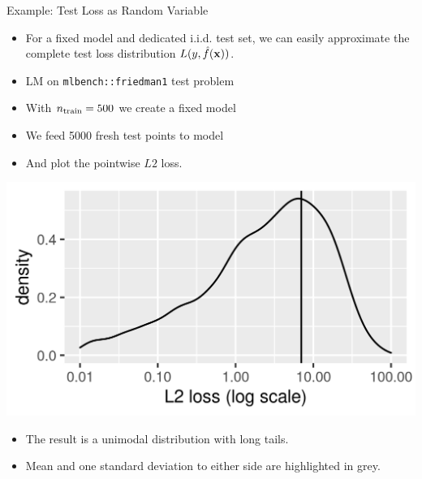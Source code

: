 \begin{vbframe}{Example: Test Loss as Random Variable}
\begin{itemize}
  \small
  \item For a fixed model and dedicated i.i.d. test set, we can easily approximate
      the complete test loss distribution $L(y, \hat{f}(\mathbf{x}))$.
  \item LM on \texttt{mlbench::friedman1} test problem
  \item With $n_{\mathrm{train}} = 500$ we create a fixed model
  \item We feed 5000 fresh test points to model
  \item And plot the pointwise $L2$ loss.
\end{itemize}

\vfill

\begin{minipage}[c]{0.5\textwidth}
  \includegraphics[width=\textwidth]{figure/fig_loss_distribution}
\end{minipage}
\begin{minipage}[c]{0.45\textwidth}
  \begin{itemize}
    \small
    \item The result is a unimodal 
    distribution with long tails.
    \item Mean and one standard deviation to either side are highlighted in 
    grey.
  \end{itemize}
\end{minipage}
\end{vbframe}


